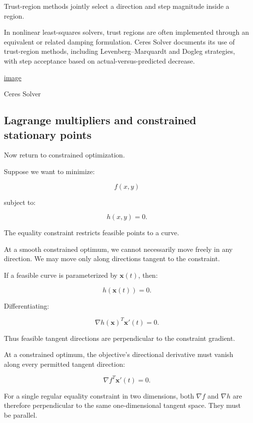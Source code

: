 Trust-region methods jointly select a direction and step magnitude inside a region.

In nonlinear least-squares solvers, trust regions are often implemented through an equivalent or related damping formulation. Ceres Solver documents its use of trust-region methods, including Levenberg--Marquardt and Dogleg strategies, with step acceptance based on actual-versus-predicted decrease. 

\href{https://www.google.com/s2/favicons?domain=https://ceres-solver.readthedocs.io&sz=32}{image}

Ceres Solver

\subsection{Lagrange multipliers and constrained stationary points}\label{02-foundations-ii-ch026-lagrange-multipliers-and-constrained-stationary-points}

\hypertarget{02-foundations-ii-ch026-lagrange-multipliers-and-constrained-stationary-points}{}

Now return to constrained optimization.

Suppose we want to minimize:

\[
f(x,y)
\]

subject to:

\[
h(x,y)=0.
\]

The equality constraint restricts feasible points to a curve.

At a smooth constrained optimum, we cannot necessarily move freely in any direction. We may move only along directions tangent to the constraint.

If a feasible curve is parameterized by \(\mathbf x(t)\), then:

\[
h(\mathbf x(t))=0.
\]

Differentiating:

\[
\nabla h(\mathbf x)^T\mathbf x'(t)=0.
\]

Thus feasible tangent directions are perpendicular to the constraint gradient.

At a constrained optimum, the objective's directional derivative must vanish along every permitted tangent direction:

\[
\nabla f^T\mathbf x'(t)=0.
\]

For a single regular equality constraint in two dimensions, both \(\nabla f\) and \(\nabla h\) are therefore perpendicular to the same one-dimensional tangent space. They must be parallel.

